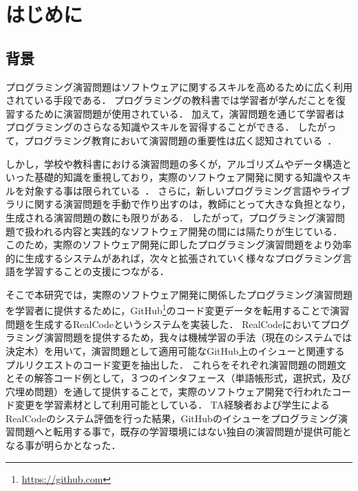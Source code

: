 
\chapter{はじめに}  %

\graphicspath{{Chapter1/Figs/}}

\section{背景}
プログラミング演習問題はソフトウェアに関するスキルを高めるために広く利用されている手段である．
プログラミングの教科書では学習者が学んだことを復習するために演習問題が使用されている．
加えて，演習問題を通じて学習者はプログラミングのさらなる知識やスキルを習得することができる．
したがって，プログラミング教育において演習問題の重要性は広く認知されている~\cite{ericsson1993role,Winslow:1996:PPP:234867.234872}．


しかし，学校や教科書における演習問題の多くが，アルゴリズムやデータ構造といった基礎的知識を重視しており，実際のソフトウェア開発に関する知識やスキルを対象する事は限られている~\cite{Allen:2003:PPC:611892.611940}．
さらに，新しいプログラミング言語やライブラリに関する演習問題を手動で作り出すのは，教師にとって大きな負担となり，生成される演習問題の数にも限りがある．
したがって，プログラミング演習問題で扱われる内容と実践的なソフトウェア開発の間には隔たりが生じている．
このため，実際のソフトウェア開発に即したプログラミング演習問題をより効率的に生成するシステムがあれば，次々と拡張されていく様々なプログラミング言語を学習することの支援につながる．

そこで本研究では，実際のソフトウェア開発に関係したプログラミング演習問題を学習者に提供するために，GitHub\footnote{\url{https://github.com}}のコード変更データを転用することで演習問題を生成するRealCodeというシステムを実装した．
RealCodeにおいてプログラミング演習問題を提供するため，我々は機械学習の手法（現在のシステムでは決定木）を用いて，演習問題として適用可能なGitHub上のイシューと関連するプルリクエストのコード変更を抽出した．
これらをそれぞれ演習問題の問題文とその解答コード例として，３つのインタフェース（単語帳形式，選択式，及び穴埋め問題）を通して提供することで，実際のソフトウェア開発で行われたコード変更を学習素材として利用可能としている．
TA経験者および学生によるRealCodeのシステム評価を行った結果，GitHubのイシューをプログラミング演習問題へと転用する事で，既存の学習環境にはない独自の演習問題が提供可能となる事が明らかとなった．


